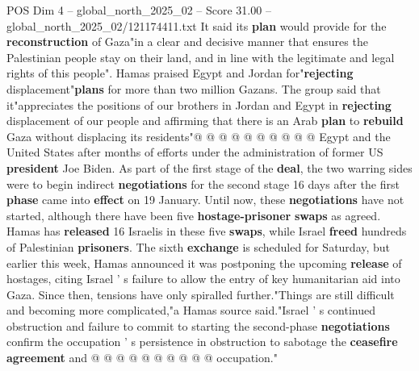 \begin{textsample}{POS Dim 4 – global\_north\_2025\_02 – Score 31.00 – global\_north\_2025\_02/121174411.txt}
It said its \textbf{plan} would provide for the \textbf{reconstruction} of Gaza"in a clear and decisive manner that ensures the Palestinian people stay on their land, and in line with the legitimate and legal rights of this people".
Hamas praised Egypt and Jordan for"\textbf{rejecting} displacement"\textbf{plans} for more than two million Gazans.
The group said that it"appreciates the positions of our brothers in Jordan and Egypt in \textbf{rejecting} displacement of our people and affirming that there is an Arab \textbf{plan} to \textbf{rebuild} Gaza without displacing its residents"@ @ @ @ @ @ @ @ @ @ Egypt and the United States after months of efforts under the administration of former US \textbf{president} Joe Biden.
As part of the first stage of the \textbf{deal}, the two warring sides were to begin indirect \textbf{negotiations} for the second stage 16 days after the first \textbf{phase} came into \textbf{effect} on 19 January.
Until now, these \textbf{negotiations} have not started, although there have been five \textbf{hostage-prisoner} \textbf{swaps} as agreed.
Hamas has \textbf{released} 16 Israelis in these five \textbf{swaps}, while Israel \textbf{freed} hundreds of Palestinian \textbf{prisoners}.
The sixth \textbf{exchange} is scheduled for Saturday, but earlier this week, Hamas announced it was postponing the upcoming \textbf{release} of hostages, citing Israel ' s failure to allow the entry of key humanitarian aid into Gaza.
Since then, tensions have only spiralled further."Things are still difficult and becoming more complicated,"a Hamas source said."Israel ' s continued obstruction and failure to commit to starting the second-phase \textbf{negotiations} confirm the occupation ' s persistence in obstruction to sabotage the \textbf{ceasefire} \textbf{agreement} and @ @ @ @ @ @ @ @ @ @ occupation."

\end{textsample}

